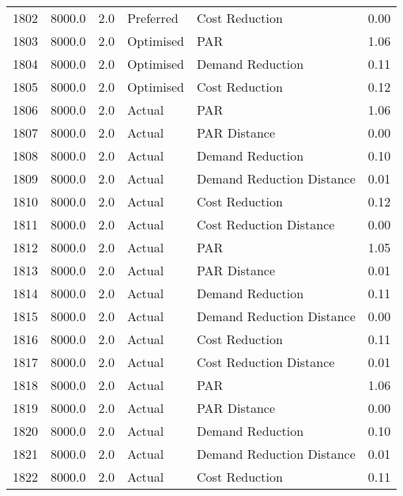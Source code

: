 \begin{longtable}{lrrllr}
1802 &       8000.0 &     2.0 &      Preferred &             Cost Reduction &   0.00 \\
1803 &       8000.0 &     2.0 &      Optimised &                        PAR &   1.06 \\
1804 &       8000.0 &     2.0 &      Optimised &           Demand Reduction &   0.11 \\
1805 &       8000.0 &     2.0 &      Optimised &             Cost Reduction &   0.12 \\
1806 &       8000.0 &     2.0 &         Actual &                        PAR &   1.06 \\
1807 &       8000.0 &     2.0 &         Actual &               PAR Distance &   0.00 \\
1808 &       8000.0 &     2.0 &         Actual &           Demand Reduction &   0.10 \\
1809 &       8000.0 &     2.0 &         Actual &  Demand Reduction Distance &   0.01 \\
1810 &       8000.0 &     2.0 &         Actual &             Cost Reduction &   0.12 \\
1811 &       8000.0 &     2.0 &         Actual &    Cost Reduction Distance &   0.00 \\
1812 &       8000.0 &     2.0 &         Actual &                        PAR &   1.05 \\
1813 &       8000.0 &     2.0 &         Actual &               PAR Distance &   0.01 \\
1814 &       8000.0 &     2.0 &         Actual &           Demand Reduction &   0.11 \\
1815 &       8000.0 &     2.0 &         Actual &  Demand Reduction Distance &   0.00 \\
1816 &       8000.0 &     2.0 &         Actual &             Cost Reduction &   0.11 \\
1817 &       8000.0 &     2.0 &         Actual &    Cost Reduction Distance &   0.01 \\
1818 &       8000.0 &     2.0 &         Actual &                        PAR &   1.06 \\
1819 &       8000.0 &     2.0 &         Actual &               PAR Distance &   0.00 \\
1820 &       8000.0 &     2.0 &         Actual &           Demand Reduction &   0.10 \\
1821 &       8000.0 &     2.0 &         Actual &  Demand Reduction Distance &   0.01 \\
1822 &       8000.0 &     2.0 &         Actual &             Cost Reduction &   0.11 \\

\end{longtable}
